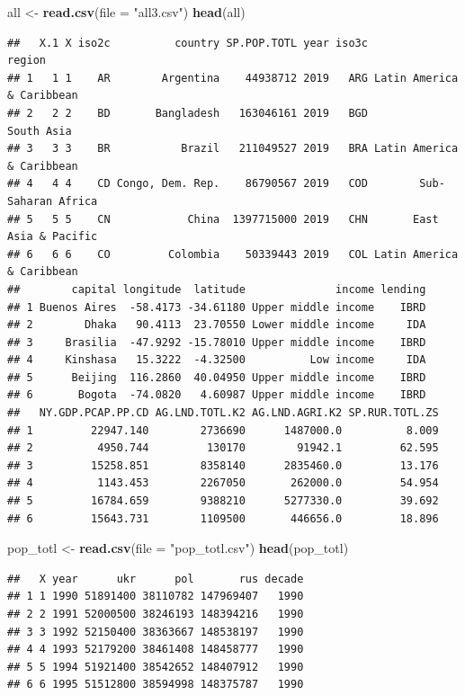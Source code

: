 \documentclass[
]{article}
\newenvironment{Shaded}{\begin{snugshade}}{\end{snugshade}}
\newcommand{\DataTypeTok}[1]{\textcolor[rgb]{0.13,0.29,0.53}{#1}}
\newcommand{\KeywordTok}[1]{\textcolor[rgb]{0.13,0.29,0.53}{\textbf{#1}}}
\newcommand{\NormalTok}[1]{#1}
\newcommand{\StringTok}[1]{\textcolor[rgb]{0.31,0.60,0.02}{#1}}
\begin{document}
\begin{Shaded}
\begin{Highlighting}[]
\NormalTok{all <-}\StringTok{ }\KeywordTok{read.csv}\NormalTok{(}\DataTypeTok{file =} \StringTok{"all3.csv"}\NormalTok{)}
\KeywordTok{head}\NormalTok{(all)}
\end{Highlighting}
\end{Shaded}

\begin{verbatim}
##   X.1 X iso2c          country SP.POP.TOTL year iso3c                    region
## 1   1 1    AR        Argentina    44938712 2019   ARG Latin America & Caribbean
## 2   2 2    BD       Bangladesh   163046161 2019   BGD                South Asia
## 3   3 3    BR           Brazil   211049527 2019   BRA Latin America & Caribbean
## 4   4 4    CD Congo, Dem. Rep.    86790567 2019   COD        Sub-Saharan Africa
## 5   5 5    CN            China  1397715000 2019   CHN       East Asia & Pacific
## 6   6 6    CO         Colombia    50339443 2019   COL Latin America & Caribbean
##        capital longitude  latitude              income lending
## 1 Buenos Aires  -58.4173 -34.61180 Upper middle income    IBRD
## 2        Dhaka   90.4113  23.70550 Lower middle income     IDA
## 3     Brasilia  -47.9292 -15.78010 Upper middle income    IBRD
## 4     Kinshasa   15.3222  -4.32500          Low income     IDA
## 5      Beijing  116.2860  40.04950 Upper middle income    IBRD
## 6       Bogota  -74.0820   4.60987 Upper middle income    IBRD
##   NY.GDP.PCAP.PP.CD AG.LND.TOTL.K2 AG.LND.AGRI.K2 SP.RUR.TOTL.ZS
## 1         22947.140        2736690      1487000.0          8.009
## 2          4950.744         130170        91942.1         62.595
## 3         15258.851        8358140      2835460.0         13.176
## 4          1143.453        2267050       262000.0         54.954
## 5         16784.659        9388210      5277330.0         39.692
## 6         15643.731        1109500       446656.0         18.896
\end{verbatim}

\begin{Shaded}
\begin{Highlighting}[]
\NormalTok{pop_totl <-}\StringTok{ }\KeywordTok{read.csv}\NormalTok{(}\DataTypeTok{file =} \StringTok{"pop_totl.csv"}\NormalTok{)}
\KeywordTok{head}\NormalTok{(pop_totl)}
\end{Highlighting}
\end{Shaded}

\begin{verbatim}
##   X year      ukr      pol       rus decade
## 1 1 1990 51891400 38110782 147969407   1990
## 2 2 1991 52000500 38246193 148394216   1990
## 3 3 1992 52150400 38363667 148538197   1990
## 4 4 1993 52179200 38461408 148458777   1990
## 5 5 1994 51921400 38542652 148407912   1990
## 6 6 1995 51512800 38594998 148375787   1990
\end{verbatim}
\end{document}
